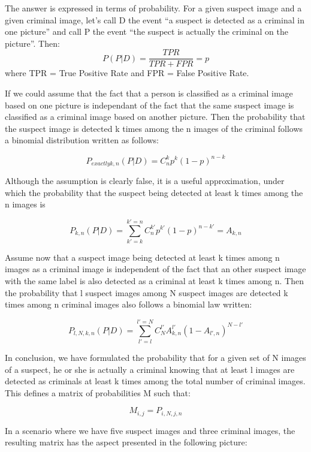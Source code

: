 The answer is expressed in terms of probability.
For a given suspect image and a given criminal image, let's call D the event \enquote{a suspect is detected as a criminal in one picture} and call P the event \enquote{the suspect is actually the criminal on the picture}.
Then:\\
\[P(P|D)=\frac{TPR}{TPR+FPR}=p\]
where TPR = True Positive Rate and FPR = False Positive Rate.

If we could assume that the fact that a person is classified as a criminal image based on one picture is independant of the fact that the same suspect image is classified as a criminal image based on another picture. Then the probability that the suspect image is detected k times among the n images of the criminal follows a binomial distribution written as follows:

\[P_{exactly k,n}(P|D)=C^{k}_{n}p^k(1-p)^{n-k}\]

Although the assumption is clearly false, it is a useful approximation, under which the probability that the suspect being detected at least k times among the n images is

\[P_{k,n}(P|D)=\sum_{k'=k}^{k'=n} C^{k'}_{n}p^{k'}(1-p)^{n-k'}=A_{k,n}\]

Assume now that a suspect image being detected at least k times among n images as a criminal image is independent of the fact that an other suspect image with the same label is also detected as a criminal at least k times among n. Then the probability that l suspect images among N suspect images are detected k times among n criminal images also follows a binomial law written:

\[P_{l,N,k,n}(P|D)=\sum_{l'=l}^{l'=N} C^{l'}_{N}A_{k,n}^{l'}(1-A_{l',n})^{N-l'}\]

In conclusion, we have formulated the probability that for a given set of N images of a suspect, he or she is actually a criminal knowing that at least l images are detected as criminals at least k times among the total number of criminal images.\\

This defines a matrix of probabilities M such that:

\[M_{i,j}=P_{i,N,j,n}\]

In a scenario where we have five suspect images and three criminal images, the resulting matrix has the aspect presented in the following picture:


